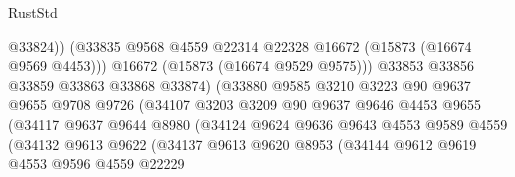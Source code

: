 \begin{lexlean}{RustStd}
\begin{coremodule}
                                        @33824))
                                    (@33835
                                      @9568
                                      @4559
                                      @22314
                                      @22328
                                      @16672
                                      (@15873 (@16674 @9569 @4453)))
                                    @16672
                                    (@15873 (@16674 @9529 @9575)))
                                  @33853
                                  @33856
                                  @33859
                                  @33863
                                  @33868
                                  @33874)
                                (@33880
                                  @9585
                                  @3210
                                  @3223
                                  @90
                                  @9637
                                  @9655
                                  @9708
                                  @9726
                                  (@34107
                                    @3203
                                    @3209
                                    @90
                                    @9637
                                    @9646
                                    @4453
                                    @9655
                                    (@34117
                                      @9637
                                      @9644
                                      @8980
                                      (@34124
                                        @9624
                                        @9636
                                        @9643
                                        @4553
                                        @9589
                                        @4559
                                        (@34132
                                          @9613
                                          @9622
                                          (@34137
                                            @9613
                                            @9620
                                            @8953
                                            (@34144
                                              @9612
                                              @9619
                                              @4553
                                              @9596
                                              @4559
                                              @22229

\end{coremodule}
\end{lexlean}
